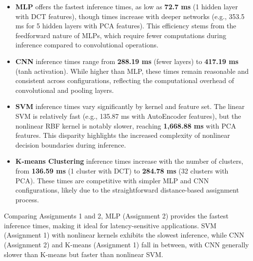 \documentclass[a4paper,12pt]{article}
\begin{document}
\begin{itemize}
    \item \textbf{MLP} offers the fastest inference times, as low as \textbf{72.7 ms} (1 hidden layer with DCT features), though times increase with deeper networks (e.g., 353.5 ms for 5 hidden layers with PCA features). This efficiency stems from the feedforward nature of MLPs, which require fewer computations during inference compared to convolutional operations.
    
    \item \textbf{CNN} inference times range from \textbf{288.19 ms} (fewer layers) to \textbf{417.19 ms} (tanh activation). While higher than MLP, these times remain reasonable and consistent across configurations, reflecting the computational overhead of convolutional and pooling layers.
    
    \item \textbf{SVM} inference times vary significantly by kernel and feature set. The linear SVM is relatively fast (e.g., 135.87 ms with AutoEncoder features), but the nonlinear RBF kernel is notably slower, reaching \textbf{1,668.88 ms} with PCA features. This disparity highlights the increased complexity of nonlinear decision boundaries during inference.
    
    \item \textbf{K-means Clustering} inference times increase with the number of clusters, from \textbf{136.59 ms} (1 cluster with DCT) to \textbf{284.78 ms} (32 clusters with PCA). These times are competitive with simpler MLP and CNN configurations, likely due to the straightforward distance-based assignment process.\\
\end{itemize}
Comparing Assignments 1 and 2, MLP (Assignment 2) provides the fastest inference times, making it ideal for latency-sensitive applications. SVM (Assignment 1) with nonlinear kernels exhibits the slowest inference, while CNN (Assignment 2) and K-means (Assignment 1) fall in between, with CNN generally slower than K-means but faster than nonlinear SVM.
\end{document}
